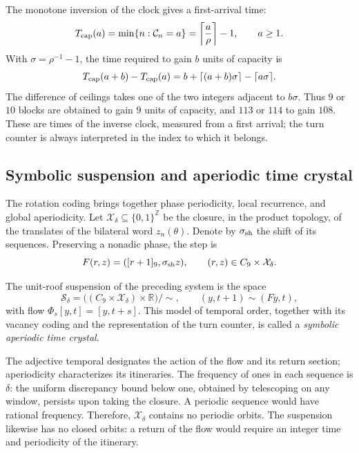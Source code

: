 The monotone inversion of the clock gives a first-arrival time:
\[
 T_{\rm cap}(a)=\min\{n:\mathcal C_n=a\}
 =\left\lceil\frac a\rho\right\rceil-1,
 \qquad a\geq1.
\]
With \(\sigma=\rho^{-1}-1\), the time required to gain \(b\) units of
capacity is
\[
 T_{\rm cap}(a+b)-T_{\rm cap}(a)
 =b+\lceil(a+b)\sigma\rceil-\lceil a\sigma\rceil.
\]
The difference of ceilings takes one of the two integers adjacent to
\(b\sigma\). Thus \(9\) or \(10\) blocks are obtained to gain
\(9\) units of capacity, and \(113\) or \(114\) to gain \(108\).
These are times of the inverse clock, measured from a first arrival; the
turn counter is always interpreted in the index to which it belongs.

\subsection{Symbolic suspension and aperiodic time crystal}
\label{mono-ampl:cristal}

The rotation coding brings together phase periodicity, local recurrence,
and global aperiodicity. Let \(\mathcal X_\delta\subseteq\{0,1\}^{\mathbb Z}\)
be the closure, in the product topology, of the translates of the bilateral
word \(z_n(\theta)\). Denote by \(\sigma_{\rm sh}\) the shift of its
sequences. Preserving a nonadic phase, the step is
\[
 F(r,z)=([r+1]_9,\sigma_{\rm sh}z),\qquad
 (r,z)\in C_9\times\mathcal X_\delta.
\]

\begin{definition}
\label{mono-ampl:def-cristal}
The unit-roof suspension of the preceding system is the space
\[
 \mathcal S_\delta=
 \bigl((C_9\times\mathcal X_\delta)\times\mathbb R\bigr)/\sim,
 \qquad (y,t+1)\sim(Fy,t),
\]
with flow \(\Phi_s[y,t]=[y,t+s]\). This model of temporal order, together
with its vacancy coding and the representation of the turn counter, is
called a \emph{symbolic aperiodic time crystal}.
\end{definition}

The adjective temporal designates the action of the flow and its return
section; aperiodicity characterizes its itineraries. The frequency of ones
in each sequence is \(\delta\): the uniform discrepancy bound below one,
obtained by telescoping on any window, persists upon taking the closure.
A periodic sequence would have rational frequency. Therefore,
\(\mathcal X_\delta\) contains no periodic orbits. The suspension likewise
has no closed orbits: a return of the flow would require an integer time and
periodicity of the itinerary.

